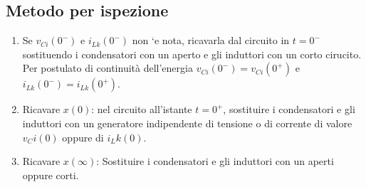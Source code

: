 \documentclass{article}
\begin{document}
\subsection{Metodo per ispezione}
\begin{enumerate}
    \item Se $v_{Ci}(0^-)$ e $i_{Lk}(0^-)$ non `e nota, ricavarla dal circuito in $t = 0^{-}$ sostituendo
    i condensatori con un aperto e gli induttori con un corto cirucito. Per postulato di continuità dell'energia $v_{Ci}(0^-)=v_{Ci}(0^+)$ e
     $i_{Lk}(0^-)=i_{Lk}(0^+)$.
    \item Ricavare $x(0)$: nel circuito all'istante $t = 0^+$, sostituire i condensatori e gli induttori con
    un generatore indipendente di tensione o di corrente di valore $v_Ci(0)$ oppure di $i_Lk(0)$.
    \item Ricavare $x(\infty)$: Sostituire i condensatori e gli induttori con un aperti oppure  corti.
\end{enumerate}
\end{document}

